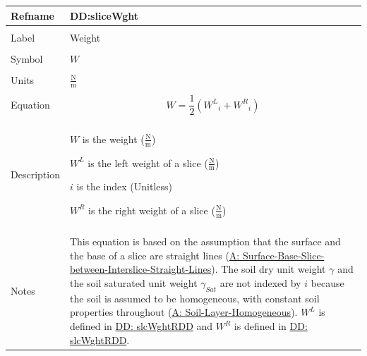 \documentclass[12pt]{article}
\begin{document}
\noindent \begin{minipage}{\textwidth}
\begin{tabular}{p{} p{}}
\toprule \textbf{Refname} & \textbf{DD:sliceWght}
\label{DD:sliceWght}
\\ \midrule \\
Label & Weight
        \\ \midrule \\
        Symbol & $W$
                 \\ \midrule \\
                 Units & $\frac{\text{N}}{\text{m}}$
                         \\ \midrule \\
                         Equation & \begin{displaymath}
                                    W=\frac{1}{2} \left({{W^{L}}}_{i}+{{W^{R}}}_{i}\right)
                                    \end{displaymath}
                                    \\ \midrule \\
                                    Description & \begin{symbDescription}
                                                  \item{$W$ is the weight ($\frac{\text{N}}{\text{m}}$)}
                                                  \item{${W^{L}}$ is the left weight of a slice ($\frac{\text{N}}{\text{m}}$)}
                                                  \item{$i$ is the index (Unitless)}
                                                  \item{${W^{R}}$ is the right weight of a slice ($\frac{\text{N}}{\text{m}}$)}
                                                  \end{symbDescription}
                                                  \\ \midrule \\
                                                  Notes & This equation is based on the assumption that the surface and the base of a slice are straight lines (\hyperref[assumpSBSBISL]{A: Surface-Base-Slice-between-Interslice-Straight-Lines}). The soil dry unit weight $γ$ and the soil saturated unit weight ${γ_{Sat}}$ are not indexed by $i$ because the soil is assumed to be homogeneous, with constant soil properties throughout (\hyperref[assumpSLH]{A: Soil-Layer-Homogeneous}). ${W^{L}}$ is defined in \hyperref[DD:slcWghtRDD]{DD: slcWghtRDD} and ${W^{R}}$ is defined in \hyperref[DD:slcWghtRDD]{DD: slcWghtRDD}.

\end{tabular}
\end{minipage}
\end{document}
